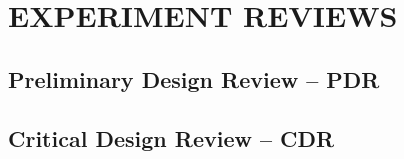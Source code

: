 \documentclass[12pt,a4paper]{report}
\begin{document}
%
%
%
%
%
%
%
%
%
%
%
%
%
%
%
%
%
%
%
%
%
%
%
%
%
%
%
%
%
%
%
%
%
%
%
%
%
%
%
%
%
%
%
%
%
%
%
%
%
%




\appendix

\chapter{EXPERIMENT REVIEWS}

\section{Preliminary Design Review -- PDR}

\section{Critical Design Review -- CDR}
\end{document}
